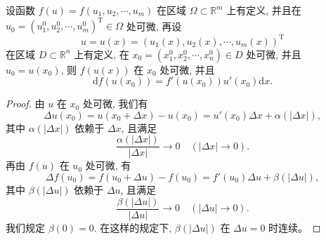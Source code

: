\documentclass[12pt,fontset=fandol]{ctexart}
\begin{document}
\begin{theorem}\label{course-theorem-14-2-2}\quad 设函数 $f(u)=f(u_1,u_2,\cdots,u_m)$ 在区域 $\Omega\subset\mathbb R^m$ 上有定义, 并且在 $u_0=(u_1^0,u_2^0,\cdots,u_m^0)^\mathrm T\in\Omega$ 处可微, 再设
\[
  u=u(x)=(u_1(x),u_2(x),\cdots,u_m(x))^\mathrm T
\]
在区域 $D\subset\mathbb R^n$ 上有定义, 在 $x_0=(x_1^0,x_2^0,\cdots,x_n^0)\in D$ 处可微, 并且 $u_0=u(x_0)$, 则 $f(u(x))$ 在 $x_0$ 处可微, 并且
\[
  \mathrm df(u(x_0))=f'(u(x_0))u'(x_0)\mathrm dx.
\]

\end{theorem}
\begin{proof}\quad 由 $u$ 在 $x_0$ 处可微, 我们有
\[
  \Delta u(x_0)=u(x_0+\Delta x)-u(x_0)
  =u'(x_0)\Delta x+\alpha(|\Delta x|),
\]
其中 $\alpha(|\Delta x|)$ 依赖于 $\Delta x$, 且满足
\[
  \frac{\alpha(|\Delta x|)}{|\Delta x|}\to0\quad(|\Delta x|\to0).
\]
再由 $f(u)$ 在 $u_0$ 处可微, 有
\[
  \Delta f(u_0)=f(u_0+\Delta u)-f(u_0)=f'(u_0)\Delta u+\beta(|\Delta u|),
\]
其中 $\beta(|\Delta u|)$ 依赖于 $\Delta u$, 且满足
\[
  \frac{\beta(|\Delta u|)}{|\Delta u|}\to0\quad(|\Delta u|\to0).
\]
我们规定 $\beta(0)=0$. 在这样的规定下, $\beta(|\Delta u|)$ 在 $\Delta u=0$ 时连续。


\end{proof}
\end{document}
